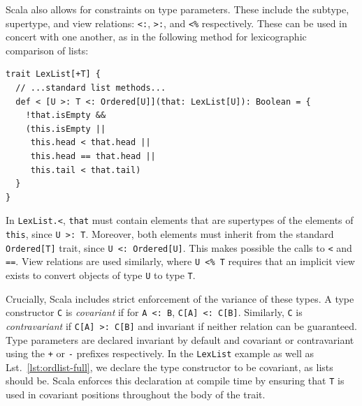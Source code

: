 \documentclass[jou,apacite]{IEEEtran}
\begin{document}
Scala also allows for constraints on type parameters. These include the subtype,
supertype, and view relations: \texttt{<:}, \texttt{>:}, and \texttt{<\%}
respectively. These can be used in concert with one another, as in the following
method for lexicographic comparison of lists:
\begin{verbatim}
trait LexList[+T] {
  // ...standard list methods...
  def < [U >: T <: Ordered[U]](that: LexList[U]): Boolean = {
    !that.isEmpty && 
    (this.isEmpty ||
     this.head < that.head || 
     this.head == that.head ||
     this.tail < that.tail)
  }
}
\end{verbatim}
In \texttt{LexList.<}, \texttt{that} must contain elements that are supertypes
of the elements of \texttt{this}, since \texttt{U >: T}. Moreover, both elements
must inherit from the standard \texttt{Ordered[T]} trait, since \texttt{U <:
  Ordered[U]}. This makes possible the calls to \texttt{<} and \texttt{==}. View
relations are used similarly, where \texttt{U <\% T} requires that an implicit
view exists to convert objects of type \texttt{U} to type
\texttt{T}.

Crucially, Scala includes strict enforcement of the variance of these types. A
type constructor \texttt{C} is \emph{covariant} if for \texttt{A <: B},
\texttt{C[A] <: C[B]}. Similarly, \texttt{C} is \emph{contravariant} if
\texttt{C[A] >: C[B]} and invariant if neither relation can be guaranteed. Type
parameters are declared invariant by default and covariant or contravariant
using the \texttt{+} or \texttt{-} prefixes respectively. In the
\texttt{LexList} example as well as Lst.~\ref{lst:ordlist-full}, we declare the
type constructor to be covariant, as lists should be. Scala enforces this
declaration at compile time by ensuring that \texttt{T} is used in covariant
positions throughout the body of the trait.
\end{document}
